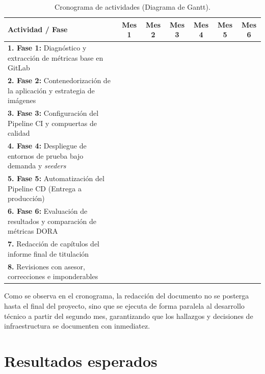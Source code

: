 \begin{table}[H]
\centering
\renewcommand{\arraystretch}{1.5} %
\footnotesize
\begin{tabular}{|p{6cm}|c|c|c|c|c|c|}
\hline
\rowcolor{gray!20} 
\textbf{Actividad / Fase} & \textbf{Mes 1} & \textbf{Mes 2} & \textbf{Mes 3} & \textbf{Mes 4} & \textbf{Mes 5} & \textbf{Mes 6} \\ \hline
\textbf{1. Fase 1:} Diagnóstico y extracción de métricas base en GitLab & \cellcolor{gray!60} & & & & & \\ \hline
\textbf{2. Fase 2:} Contenedorización de la aplicación y estrategia de imágenes & \cellcolor{gray!60} & \cellcolor{gray!60} & & & & \\ \hline
\textbf{3. Fase 3:} Configuración del Pipeline CI y compuertas de calidad & & \cellcolor{gray!60} & \cellcolor{gray!60} & & & \\ \hline
\textbf{4. Fase 4:} Despliegue de entornos de prueba bajo demanda y \emph{seeders} & & & \cellcolor{gray!60} & \cellcolor{gray!60} & & \\ \hline
\textbf{5. Fase 5:} Automatización del Pipeline CD (Entrega a producción) & & & & \cellcolor{gray!60} & \cellcolor{gray!60} & \\ \hline
\textbf{6. Fase 6:} Evaluación de resultados y comparación de métricas DORA & & & & & \cellcolor{gray!60} & \\ \hline
\textbf{7.} Redacción de capítulos del informe final de titulación & & \cellcolor{gray!60} & \cellcolor{gray!60} & \cellcolor{gray!60} & \cellcolor{gray!60} & \cellcolor{gray!60} \\ \hline
\textbf{8.} Revisiones con asesor, correcciones e imponderables & & & & & \cellcolor{gray!60} & \cellcolor{gray!60} \\ \hline
\end{tabular}
\caption{Cronograma de actividades (Diagrama de Gantt).}
\label{tab:cronograma}
\end{table}

Como se observa en el cronograma, la redacción del documento no se posterga hasta el final del proyecto, sino que se ejecuta de forma paralela al desarrollo técnico a partir del segundo mes, garantizando que los hallazgos y decisiones de infraestructura se documenten con inmediatez.

\section{Resultados esperados}


